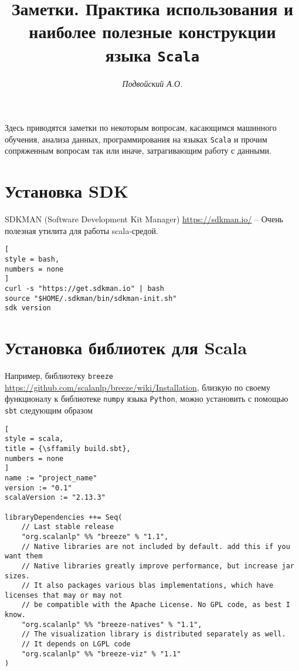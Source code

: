 \documentclass[%
	11pt,
	a4paper,
	utf8,
		]{article}
\begin{document}
\title{Заметки. Практика использования и наиболее полезные конструкции языка \texttt{Scala}}

\author{\itshape Подвойский А.О.}

\date{}
\maketitle

\thispagestyle{fancy}

Здесь приводятся заметки по некоторым вопросам, касающимся машинного обучения, анализа данных, программирования на языках \texttt{Scala} и прочим сопряженным вопросам так или иначе, затрагивающим работу с данными.



\tableofcontents

\section{Установка SDK}

SDKMAN (Software Development Kit Manager) \url{https://sdkman.io/} -- Очень полезная утилита для работы scala-средой.

\begin{lstlisting}[
style = bash,
numbers = none	
]
curl -s "https://get.sdkman.io" | bash
source "$HOME/.sdkman/bin/sdkman-init.sh"
sdk version
\end{lstlisting}

\section{Установка библиотек для Scala}

Например, библиотеку \texttt{breeze} \url{https://github.com/scalanlp/breeze/wiki/Installation}, близкую по своему функционалу к библиотеке \texttt{numpy} языка \texttt{Python}, можно установить с помощью \texttt{sbt} следующим образом
\begin{lstlisting}[
style = scala,
title = {\sffamily build.sbt},
numbers = none	
]
name := "project_name"
version := "0.1"
scalaVersion := "2.13.3"

libraryDependencies ++= Seq(
    // Last stable release
    "org.scalanlp" %% "breeze" % "1.1",
    // Native libraries are not included by default. add this if you want them
    // Native libraries greatly improve performance, but increase jar sizes. 
    // It also packages various blas implementations, which have licenses that may or may not
    // be compatible with the Apache License. No GPL code, as best I know.
    "org.scalanlp" %% "breeze-natives" % "1.1",
    // The visualization library is distributed separately as well.
    // It depends on LGPL code
    "org.scalanlp" %% "breeze-viz" % "1.1"
)
\end{lstlisting}
\end{document}
